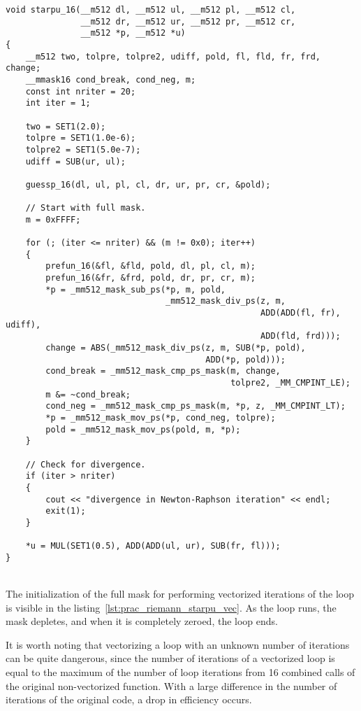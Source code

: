 \documentclass[
11pt,%
tightenlines,%
twoside,%
onecolumn,%
nofloats,%
nobibnotes,%
nofootinbib,%
superscriptaddress,%
noshowpacs,%
centertags]%
{revtex4}
\begin{document}
\begin{lstlisting}[caption={Vectorized version of $starpu$.},label={lst:prac_riemann_starpu_vec}]
void starpu_16(__m512 dl, __m512 ul, __m512 pl, __m512 cl,
               __m512 dr, __m512 ur, __m512 pr, __m512 cr,
               __m512 *p, __m512 *u)
{
    __m512 two, tolpre, tolpre2, udiff, pold, fl, fld, fr, frd, change;
    __mmask16 cond_break, cond_neg, m;
    const int nriter = 20;
    int iter = 1;

    two = SET1(2.0);
    tolpre = SET1(1.0e-6);
    tolpre2 = SET1(5.0e-7);
    udiff = SUB(ur, ul);

    guessp_16(dl, ul, pl, cl, dr, ur, pr, cr, &pold);

    // Start with full mask.
    m = 0xFFFF;

    for (; (iter <= nriter) && (m != 0x0); iter++)
    {
        prefun_16(&fl, &fld, pold, dl, pl, cl, m);
        prefun_16(&fr, &frd, pold, dr, pr, cr, m);
        *p = _mm512_mask_sub_ps(*p, m, pold,
                                _mm512_mask_div_ps(z, m,
                                                   ADD(ADD(fl, fr), udiff),
                                                   ADD(fld, frd)));
        change = ABS(_mm512_mask_div_ps(z, m, SUB(*p, pold),
                                        ADD(*p, pold)));
        cond_break = _mm512_mask_cmp_ps_mask(m, change,
                                             tolpre2, _MM_CMPINT_LE);
        m &= ~cond_break;
        cond_neg = _mm512_mask_cmp_ps_mask(m, *p, z, _MM_CMPINT_LT);
        *p = _mm512_mask_mov_ps(*p, cond_neg, tolpre);
        pold = _mm512_mask_mov_ps(pold, m, *p);
    }

    // Check for divergence.
    if (iter > nriter)
    {
        cout << "divergence in Newton-Raphson iteration" << endl;
        exit(1);
    }

    *u = MUL(SET1(0.5), ADD(ADD(ul, ur), SUB(fr, fl)));
}
\end{lstlisting}

\ \\

The initialization of the full mask for performing vectorized iterations of the loop is visible in the listing~\ref{lst:prac_riemann_starpu_vec}.
As the loop runs, the mask depletes, and when it is completely zeroed, the loop ends.

It is worth noting that vectorizing a loop with an unknown number of iterations can be quite dangerous, since the number of iterations of a vectorized loop is equal to the maximum of the number of loop iterations from 16 combined calls of the original non-vectorized function.
With a large difference in the number of iterations of the original code, a drop in efficiency occurs.
\end{document}
